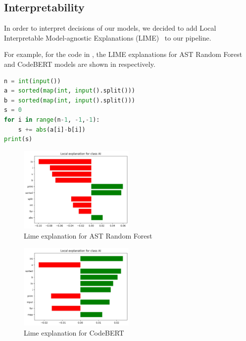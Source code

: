 \documentclass{article}
\begin{document}
\subsection{Interpretability}

In order to interpret decisions of our models, we decided to add Local Interpretable Model-agnostic Explanations (LIME)~\cite{Ribeiro16} to our pipeline.

For example, for the code in , the LIME explanations for AST Random Forest and CodeBERT models are shown in  respectively.

\begin{minipage}{\linewidth}
  \begin{lstlisting}[language=Python,frame=single,caption=Python code snippet,label=lst:code_lime]
n = int(input())
a = sorted(map(int, input().split()))
b = sorted(map(int, input().split()))
s = 0
for i in range(n-1, -1,-1):
    s += abs(a[i]-b[i])
print(s)
\end{lstlisting}
\end{minipage}

\begin{figure}[H]
  \centering
  \includegraphics[width=0.5\textwidth]{./pictures/ast_lime.jpg}
  \caption{Lime explanation for AST Random Forest}\label{fig:LIME_AST}
\end{figure}

\begin{figure}[H]
  \centering
  \includegraphics[width=0.5\textwidth]{./pictures/codebert_lime.jpg}
  \caption{Lime explanation for CodeBERT}\label{fig:LIME_CodeBERT}
\end{figure}
\end{document}
